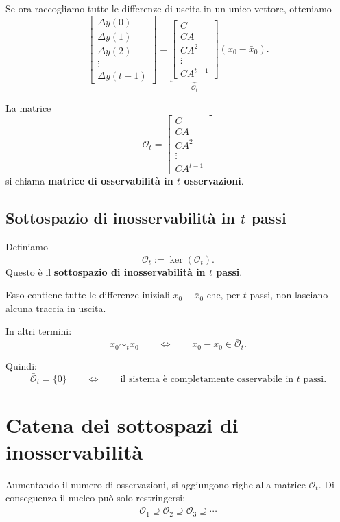 Se ora raccogliamo tutte le differenze di uscita in un unico vettore, otteniamo
\[
\begin{bmatrix}
\Delta y(0)\\
\Delta y(1)\\
\Delta y(2)\\
\vdots\\
\Delta y(t-1)
\end{bmatrix}
=
\underbrace{
\begin{bmatrix}
C\\
CA\\
CA^2\\
\vdots\\
CA^{t-1}
\end{bmatrix}}_{\displaystyle \mathcal O_t}
(x_0-\bar x_0).
\]

La matrice
\[
\mathcal O_t=
\begin{bmatrix}
C\\
CA\\
CA^2\\
\vdots\\
CA^{t-1}
\end{bmatrix}
\]
si chiama \textbf{matrice di osservabilità in \(t\) osservazioni}.

\subsection{Sottospazio di inosservabilità in \(t\) passi}

Definiamo
\[
\bar{\mathcal O}_t:=\ker(\mathcal O_t).
\]
Questo è il \textbf{sottospazio di inosservabilità in \(t\) passi}.

Esso contiene tutte le differenze iniziali \(x_0-\bar x_0\) che, per \(t\) passi, non lasciano alcuna traccia in uscita.

In altri termini:
\[
x_0 \sim_t \bar x_0
\qquad \Longleftrightarrow \qquad
x_0-\bar x_0\in \bar{\mathcal O}_t.
\]

Quindi:
\[
\bar{\mathcal O}_t=\{0\}
\qquad \Longleftrightarrow \qquad
\text{il sistema è completamente osservabile in \(t\) passi.}
\]

\section{Catena dei sottospazi di inosservabilità}

Aumentando il numero di osservazioni, si aggiungono righe alla matrice \(\mathcal O_t\).  
Di conseguenza il nucleo può solo restringersi:
\[
\bar{\mathcal O}_1 \supseteq \bar{\mathcal O}_2 \supseteq \bar{\mathcal O}_3 \supseteq \cdots
\]

